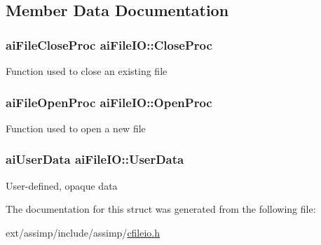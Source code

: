 \subsection{Member Data Documentation}
\hypertarget{structai_file_i_o_a7ec702672712b5a02dc49cb17f980a14}{
\subsubsection[{Close\-Proc}]{\setlength{\rightskip}{0pt plus 5cm}ai\-File\-Close\-Proc ai\-File\-I\-O\-::\-Close\-Proc}}\label{structai_file_i_o_a7ec702672712b5a02dc49cb17f980a14}
Function used to close an existing file \hypertarget{structai_file_i_o_a819d9c7823039294125068d06949a6df}{
\subsubsection[{Open\-Proc}]{\setlength{\rightskip}{0pt plus 5cm}ai\-File\-Open\-Proc ai\-File\-I\-O\-::\-Open\-Proc}}\label{structai_file_i_o_a819d9c7823039294125068d06949a6df}
Function used to open a new file \hypertarget{structai_file_i_o_a9c62b7f3d70fbb2f41e33ad0b9933139}{
\subsubsection[{User\-Data}]{\setlength{\rightskip}{0pt plus 5cm}ai\-User\-Data ai\-File\-I\-O\-::\-User\-Data}}\label{structai_file_i_o_a9c62b7f3d70fbb2f41e33ad0b9933139}
User-\/defined, opaque data 

The documentation for this struct was generated from the following file\-:\begin{DoxyCompactItemize}
\item 
ext/assimp/include/assimp/\hyperlink{cfileio_8h}{cfileio.\-h}\end{DoxyCompactItemize}
